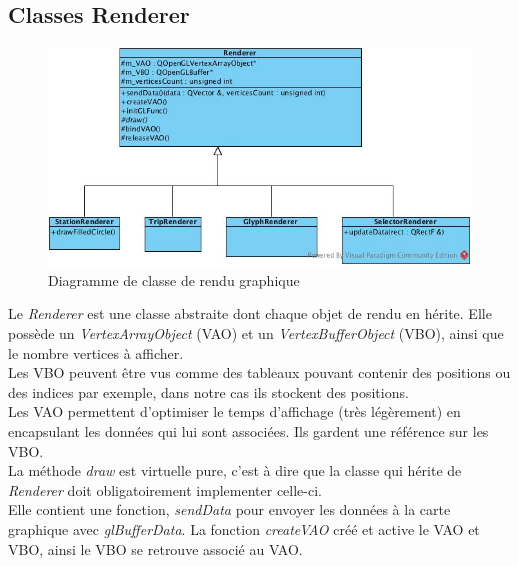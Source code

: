 \documentclass[12pt]{article}
\begin{document}
\clearpage
		\subsection{Classes Renderer}
		
		\begin{figure}[!h]
		\begin{center}
		\includegraphics[scale=.7]{dia_class_renderer.png}
		\caption{Diagramme de classe de rendu graphique}
		\label{fig:dia_class_renderer}
		\end{center}
		\end{figure}		
		
		Le \textit{Renderer} est une classe abstraite dont chaque objet de rendu en hérite. Elle possède
		un \textit{VertexArrayObject} (VAO) et un \textit{VertexBufferObject} (VBO), ainsi que le nombre vertices à afficher.\\
		
		Les VBO peuvent être vus comme des tableaux pouvant contenir des positions ou des indices par exemple, dans notre cas ils stockent des positions.\\

		Les VAO permettent d’optimiser le temps d’affichage (très légèrement) en encapsulant les données qui lui sont associées. Ils gardent une référence sur les VBO.\\
		
		La méthode \textit{draw} est virtuelle pure, c’est à dire que la classe qui hérite de \textit{Renderer} doit obligatoirement implementer celle-ci.\\

		Elle contient une fonction, \textit{sendData} pour envoyer les données à la carte graphique avec \textit{glBufferData}. La fonction \textit{createVAO} créé et active le VAO et VBO, ainsi le VBO se
		retrouve associé au VAO.\\		
		
\end{document}
